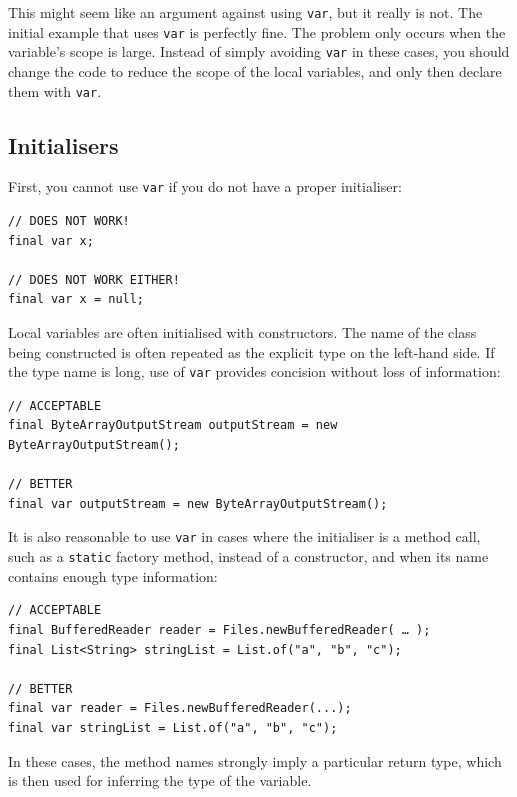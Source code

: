 \documentclass[11pt,a4paper, titlepage, parskip=half, headsepline, footsepline, cleardoublepage=current, headheight=1cm]{scrbook}
\begin{document}
This might seem like an argument against using \lstinline|var|, but it really is not. The initial example that uses \lstinline|var| is perfectly fine. The problem only occurs when the variable's scope is large. Instead of simply avoiding \lstinline|var| in these cases, you should change the code to reduce the scope of the local variables, and only then declare them with \lstinline|var|.


\subsection{Initialisers}\label{sec:varInitialisers}
First, you cannot use \lstinline|var| if you do not have a proper initialiser:
\begin{lstlisting}
// DOES NOT WORK!
final var x;

// DOES NOT WORK EITHER!
final var x = null;
\end{lstlisting}

Local variables are often initialised with constructors. The name of the class being constructed is often repeated as the explicit type on the left-hand side. If the type name is long, use of \lstinline|var| provides concision without loss of information:
\begin{lstlisting}
// ACCEPTABLE
final ByteArrayOutputStream outputStream = new ByteArrayOutputStream();

// BETTER
final var outputStream = new ByteArrayOutputStream();
\end{lstlisting}

It is also reasonable to use \lstinline|var| in cases where the initialiser is a method call, such as a \lstinline|static| factory method, instead of a constructor, and when its name contains enough type information:
\begin{lstlisting}
// ACCEPTABLE
final BufferedReader reader = Files.newBufferedReader( … );
final List<String> stringList = List.of("a", "b", "c");

// BETTER
final var reader = Files.newBufferedReader(...);
final var stringList = List.of("a", "b", "c");
\end{lstlisting}

In these cases, the method names strongly imply a particular return type, which is then used for inferring the type of the variable.
\end{document}

